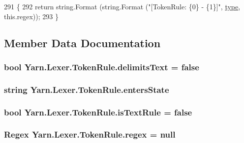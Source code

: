 \begin{DoxyCode}
291             \{
292                 \textcolor{keywordflow}{return} string.Format (string.Format (\textcolor{stringliteral}{"[TokenRule: \{0\} - \{1\}]"}, 
      \hyperlink{a00082_a0de6fac3b55cf0c61e07cea53ce67caa}{type}, this.regex));
293             \}
\end{DoxyCode}


\subsection{Member Data Documentation}
\hypertarget{a00082_ab0849136a1f27b4d13cb7a45e2fe7130}{
\subsubsection[{delimits\-Text}]{\setlength{\rightskip}{0pt plus 5cm}bool Yarn.\-Lexer.\-Token\-Rule.\-delimits\-Text = false}}\label{a00082_ab0849136a1f27b4d13cb7a45e2fe7130}
\hypertarget{a00082_af6a4bd3416c4e1b8e56f9db461d52d18}{
\subsubsection[{enters\-State}]{\setlength{\rightskip}{0pt plus 5cm}string Yarn.\-Lexer.\-Token\-Rule.\-enters\-State}}\label{a00082_af6a4bd3416c4e1b8e56f9db461d52d18}
\hypertarget{a00082_a09f49e6edf9ace38a92d723998181f8f}{
\subsubsection[{is\-Text\-Rule}]{\setlength{\rightskip}{0pt plus 5cm}bool Yarn.\-Lexer.\-Token\-Rule.\-is\-Text\-Rule = false}}\label{a00082_a09f49e6edf9ace38a92d723998181f8f}
\hypertarget{a00082_a47a404d6637fae489c3c77729a01cc69}{
\subsubsection[{regex}]{\setlength{\rightskip}{0pt plus 5cm}Regex Yarn.\-Lexer.\-Token\-Rule.\-regex = null}}\label{a00082_a47a404d6637fae489c3c77729a01cc69}
